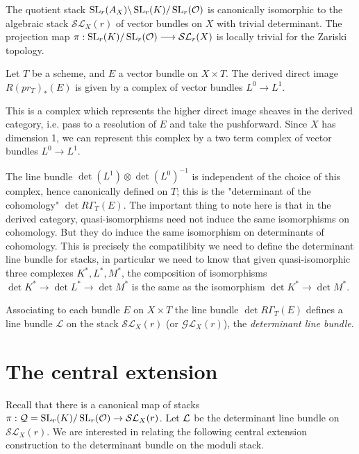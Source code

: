 \documentclass[12pt]{article}
\begin{document}
\begin{proposition}
    The quotient stack $\operatorname{SL}_r(A_X)\backslash\operatorname{SL}_r(K)/\operatorname{SL}_r(\mathcal{O})$ is canonically isomorphic to the algebraic stack $\mathcal{S}\mathcal{L}_X(r)$ of vector bundles on $X$ with trivial determinant. The projection map $\pi : \operatorname{SL}_r(K)/\operatorname{SL}_r(\mathcal{O}) \longrightarrow \mathcal{S}\mathcal{L}_r(X)$ is locally trivial for the Zariski topology.
\end{proposition}

\begin{example}
     Let $T$ be a scheme, and $E$ a vector bundle on $X \times T$. The derived direct image $R(pr_{T})_*(E)$ is given by a complex of vector bundles $L^0 \to L^1$.

    This is a complex which represents the higher direct image sheaves in the derived category, i.e. pass to a resolution of $E$ and take the pushforward. Since $X$ has dimension 1, we can represent this complex by a two term complex of vector bundles $L^0 \to L^1$.

    The line bundle $\det(L^1) \otimes \det(L^0)^{-1}$ is independent of the choice of this complex, hence canonically defined on $T$; this is the "determinant of the cohomology" $\det R\Gamma_{T}(E)$. The important thing to note here is that in the derived category, quasi-isomorphisms need not induce the same isomorphisms on cohomology. But they do induce the same isomorphism on determinants of cohomology. This is precisely the compatilibity we need to define the determinant line bundle for stacks, in particular we need to know that given quasi-isomorphic three complexes $K^*, L^*, M^*$, the composition of isomorphisms $\det K^* \to \det L^* \to \det M^*$ is the same as the isomorphism $\det K^* \to \det M^*$.

    Associating to each bundle $E$ on $X \times T$ the line bundle $\det R\Gamma_{T}(E)$ defines a line bundle $\mathcal{L}$ on the stack $\mathcal{S}\mathcal{L}_{X}(r)$ (or $\mathcal{G}\mathcal{L}_{X}(r)$), the \textit{determinant line bundle}.
\end{example}

\section{The central extension}
Recall that there is a canonical map of stacks $\pi:{\mathcal{Q}} = \operatorname{SL}_r(K) / \operatorname{SL}_r(\mathcal{O}) \to \mathcal{SL}_X(r)$. Let ${\mathcal{L}}$ be the determinant line bundle on $\mathcal{SL}_X(r)$. We are interested in relating the following central extension construction to the determinant bundle on the moduli stack.
\end{document}

